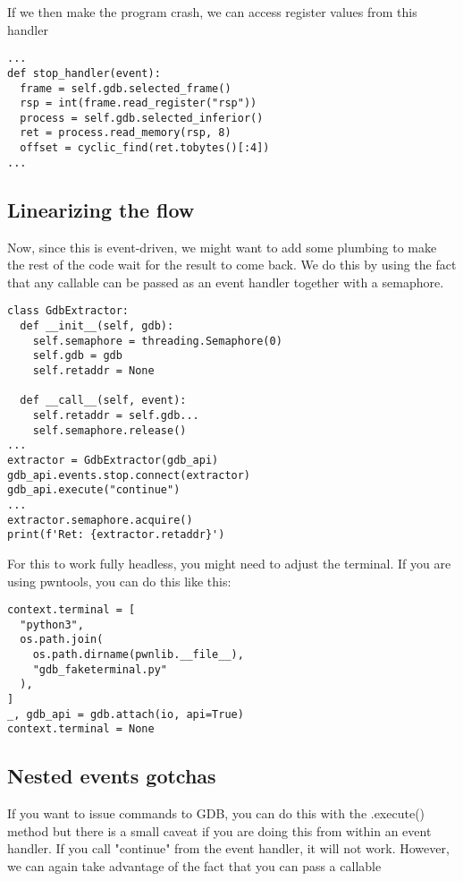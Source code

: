 \documentclass[twocolumn]{article}
\begin{document}
If we then make the program crash, we can access register values from this handler

\begin{verbatim}
...
def stop_handler(event):
  frame = self.gdb.selected_frame()
  rsp = int(frame.read_register("rsp"))
  process = self.gdb.selected_inferior()
  ret = process.read_memory(rsp, 8)
  offset = cyclic_find(ret.tobytes()[:4])
...
\end{verbatim}

\vspace*{-0.5\baselineskip}
\subsection*{Linearizing the flow}

Now, since this is event-driven, we might want to add some plumbing to make the rest of the code wait for the result to come back. We do this by using the fact that any callable can be passed as an event handler together with a semaphore.

\begin{verbatim}
class GdbExtractor:
  def __init__(self, gdb):
    self.semaphore = threading.Semaphore(0)
    self.gdb = gdb
    self.retaddr = None

  def __call__(self, event):
    self.retaddr = self.gdb...
    self.semaphore.release()
...
extractor = GdbExtractor(gdb_api)
gdb_api.events.stop.connect(extractor)
gdb_api.execute("continue")
...
extractor.semaphore.acquire()
print(f'Ret: {extractor.retaddr}')
\end{verbatim}

For this to work fully headless, you might need to adjust the terminal. If you are using pwntools, you can do this like this:

\begin{verbatim}
context.terminal = [
  "python3",
  os.path.join(
    os.path.dirname(pwnlib.__file__),
    "gdb_faketerminal.py"
  ),
]
_, gdb_api = gdb.attach(io, api=True)
context.terminal = None
\end{verbatim}

\vspace*{-0.5\baselineskip}
\subsection*{Nested events gotchas}

If you want to issue commands to GDB, you can do this with the .execute() method but there is a small caveat if you are doing this from within an event handler. If you call "continue" from the event handler, it will not work. However, we can again take advantage of the fact that you can pass a callable
\end{document}
